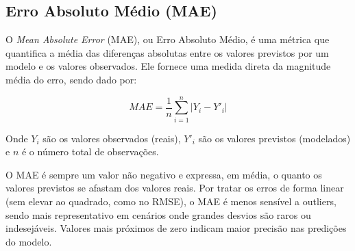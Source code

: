 \subsection{Erro Absoluto Médio (MAE)}
O \textit{Mean Absolute Error} (MAE), ou Erro Absoluto Médio, é uma métrica que quantifica a média das diferenças
absolutas entre os valores previstos por um modelo e os valores observados. Ele fornece uma medida direta da magnitude
média do erro, sendo dado por:

\begin{equation}
MAE = \frac{1}{n} \sum_{i=1}^{n} \left| Y_i - Y'_i \right|
\end{equation}

Onde $Y_i$ são os valores observados (reais), $Y'_i$ são os valores previstos (modelados) e $n$ é o número total de
observações.

O MAE é sempre um valor não negativo e expressa, em média, o quanto os valores previstos se afastam dos valores reais.
Por tratar os erros de forma linear (sem elevar ao quadrado, como no RMSE), o MAE é menos sensível a outliers, sendo
mais representativo em cenários onde grandes desvios são raros ou indesejáveis. Valores mais próximos de zero indicam
maior precisão nas predições do modelo.